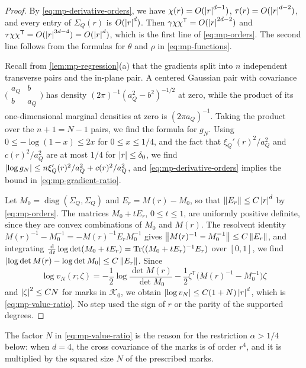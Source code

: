 \begin{proof}
By \eqref{eq:mp-derivative-orders}, we have $\chi(r)=O(\left|r\right|^{d-1})$, $\tau(r)=O(\left|r\right|^{d-2})$, and every entry of $\Sigma_Q(r)$ is $O(\left|r\right|^d)$. Then $\gamma\chi\chi^{\mathsf T}=O(\left|r\right|^{2d-2})$ and $\tau\chi\chi^{\mathsf T}=O(\left|r\right|^{3d-4})=O(\left|r\right|^d)$, which is the first line of \eqref{eq:mp-orders}. The second line follows from the formulas for $\theta$ and $\rho$ in \eqref{eq:mp-functions}.

Recall from \cref{lem:mp-regression}(a) that the gradients split into $n$ independent transverse pairs and the in-plane pair. A centered Gaussian pair with covariance $\bigl(\begin{smallmatrix}a_Q&b\\b&a_Q\end{smallmatrix}\bigr)$ has density $(2\pi)^{-1}(a_Q^2-b^2)^{-1/2}$ at zero, while the product of its one-dimensional marginal densities at zero is $(2\pi a_Q)^{-1}$. Taking the product over the $n+1=N-1$ pairs, we find the formula for $g_N$. Using $0\le-\log(1-x)\le2x$ for $0\le x\le1/4$, and the fact that $\xi_Q'(r)^2/a_Q^2$ and $c(r)^2/a_Q^2$ are at most $1/4$ for $\left|r\right|\le\delta_0$, we find $\left|\log g_N\right|\le n\xi_Q'(r)^2/a_Q^2+c(r)^2/a_Q^2$, and \eqref{eq:mp-derivative-orders} implies the bound in \eqref{eq:mp-gradient-ratio}.

Let $M_0=\operatorname{diag}(\Sigma_Q,\Sigma_Q)$ and $E_r=M(r)-M_0$, so that $\left\lVert E_r\right\rVert\le C\left|r\right|^d$ by \eqref{eq:mp-orders}. The matrices $M_0+tE_r$, $0\le t\le1$, are uniformly positive definite, since they are convex combinations of $M_0$ and $M(r)$. The resolvent identity $M(r)^{-1}-M_0^{-1}=-M(r)^{-1}E_rM_0^{-1}$ gives $\left\lVert M(r)^{-1}-M_0^{-1}\right\rVert\le C\left\lVert E_r\right\rVert$, and integrating $\frac{\,\mathrm d}{\,\mathrm d t}\log\det(M_0+tE_r)=\operatorname{Tr}((M_0+tE_r)^{-1}E_r)$ over $[0,1]$, we find $\left|\log\det M(r)-\log\det M_0\right|\le C\left\lVert E_r\right\rVert$. Since
\[
\log v_N(r;\zeta)=-\frac12\log\frac{\det M(r)}{\det M_0}-\frac12\zeta^{\mathsf T}\bigl(M(r)^{-1}-M_0^{-1}\bigr)\zeta
\]
and $\left|\zeta\right|^2\le CN$ for marks in $\mathcal K_0$, we obtain $\left|\log v_N\right|\le C(1+N)\left|r\right|^d$, which is \eqref{eq:mp-value-ratio}. No step used the sign of $r$ or the parity of the supported degrees.
\end{proof}

The factor $N$ in \eqref{eq:mp-value-ratio} is the reason for the restriction $\alpha>1/4$ below: when $d=4$, the cross covariance of the marks is of order $r^4$, and it is multiplied by the squared size $N$ of the prescribed marks.

